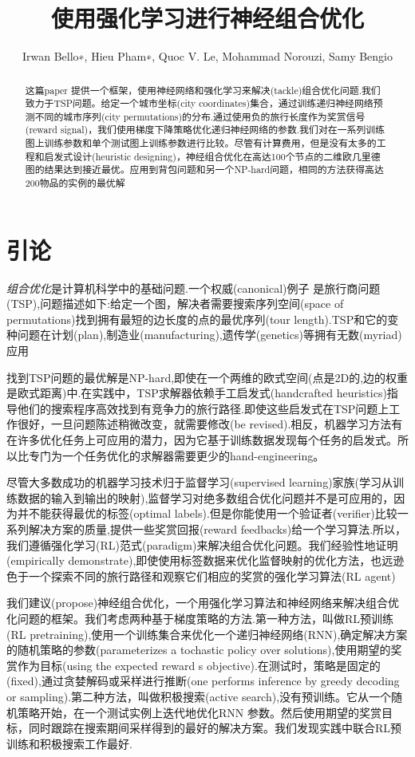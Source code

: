 \documentclass[a4paper,UTF8]{ctexart}
\theoremstyle{definition}
\begin{document}
\title{使用强化学习进行神经组合优化}
\author{Irwan Bello∗, Hieu Pham∗, Quoc V. Le, Mohammad Norouzi, Samy Bengio}
\maketitle
\begin{abstract}
这篇paper 提供一个框架，使用神经网络和强化学习来解决(tackle)组合优化问题.我们致力于TSP问题。给定一个城市坐标(city coordinates)集合，通过训练递归神经网络预测不同的城市序列(city permutations)的分布.通过使用负的旅行长度作为奖赏信号(reward signal)，我们使用梯度下降策略优化递归神经网络的参数.我们对在一系列训练图上训练参数和单个测试图上训练参数进行比较。尽管有计算费用，但是没有太多的工程和启发式设计(heuristic designing)，神经组合优化在高达100个节点的二维欧几里德图的结果达到接近最优。应用到背包问题和另一个NP-hard问题，相同的方法获得高达200物品的实例的最优解
\end{abstract}

\section{引论}

\emph{组合优化}是计算机科学中的基础问题.一个权威(canonical)例子 是旅行商问题(TSP),问题描述如下:给定一个图，解决者需要搜索序列空间(space of permutations)找到拥有最短的边长度的点的最优序列(tour length).TSP和它的变种问题在计划(plan),制造业(manufacturing),遗传学(genetics)等拥有无数(myriad)应用

找到TSP问题的最优解是NP-hard,即使在一个两维的欧式空间(点是2D的,边的权重是欧式距离)中.在实践中，TSP求解器依赖手工启发式(handcrafted heuristics)指导他们的搜索程序高效找到有竞争力的旅行路径.即使这些启发式在TSP问题上工作很好，一旦问题陈述稍微改变，就需要修改(be revised).相反，机器学习方法有在许多优化任务上可应用的潜力，因为它基于训练数据发现每个任务的启发式。所以比专门为一个任务优化的求解器需要更少的hand-engineering。

尽管大多数成功的机器学习技术归于监督学习(supervised learning)家族(学习从训练数据的输入到输出的映射),监督学习对绝多数组合优化问题并不是可应用的，因为并不能获得最优的标签(optimal labels).但是你能使用一个验证者(verifier)比较一系列解决方案的质量,提供一些奖赏回报(reward feedbacks)给一个学习算法.所以，我们遵循强化学习(RL)范式(paradigm)来解决组合优化问题。我们经验性地证明(empirically demonstrate),即使使用标签数据来优化监督映射的优化方法，也远逊色于一个探索不同的旅行路径和观察它们相应的奖赏的强化学习算法(RL agent)

我们建议(propose)神经组合优化，一个用强化学习算法和神经网络来解决组合优化问题的框架。我们考虑两种基于梯度策略的方法.第一种方法，叫做RL预训练(RL pretraining),使用一个训练集合来优化一个递归神经网络(RNN),确定解决方案的随机策略的参数(parameterizes a tochastic policy over solutions),使用期望的奖赏作为目标(using the expected reward s objective).在测试时，策略是固定的(fixed),通过贪婪解码或采样进行推断(one performs inference by greedy decoding or sampling).第二种方法，叫做积极搜索(active search),没有预训练。它从一个随机策略开始，在一个测试实例上迭代地优化RNN 参数。然后使用期望的奖赏目标，同时跟踪在搜索期间采样得到的最好的解决方案。我们发现实践中联合RL预训练和积极搜索工作最好.
\end{document}
